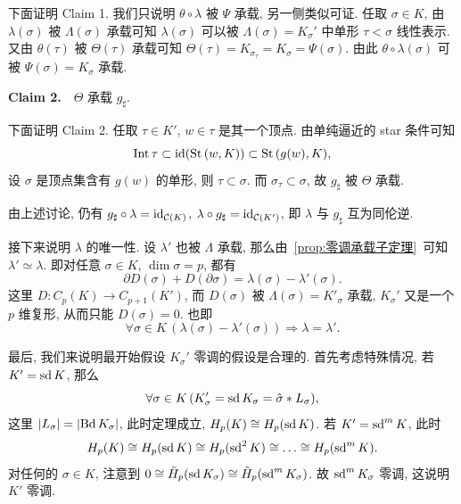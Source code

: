 \begin{Proof}
	下面证明 Claim 1. 我们只说明 $ \theta\circ\lambda $ 被 $ \Psi $ 承载, 另一侧类似可证. 任取 $ \sigma\in K $, 由 $ \lambda(\sigma) $ 被 $ \Lambda(\sigma) $ 承载可知 $ \lambda(\sigma) $ 可以被 $ \Lambda(\sigma)=K_\sigma' $ 中单形 $ \tau<\sigma $ 线性表示. 又由 $ \theta(\tau) $ 被 $ \Theta(\tau) $ 承载可知 $ \Theta(\tau)=K_{\sigma_\tau}=K_\sigma=\Psi(\sigma) $. 由此 $ \theta\circ\lambda(\sigma) $ 可被 $ \Psi(\sigma)=K_\sigma $ 承载.

	\textbf{Claim 2.}\ \ $ \Theta $ 承载 $ g_\sharp $.

	下面证明 Claim 2. 任取 $ \tau\in K' $, $ w\in\tau $ 是其一个顶点. 由单纯逼近的 star 条件可知
	\[
		\mathrm{Int}\,\tau\subset\mathrm{id}(\mathrm{St}\,(w,K))\subset\mathrm{St}\,(g(w),K),
	\]
	设 $ \sigma $ 是顶点集含有 $ g(w) $ 的单形, 则 $ \tau\subset\sigma $. 而 $ \sigma_\tau\subset\sigma $, 故 $ g_\sharp $ 被 $ \Theta $ 承载.

	由上述讨论, 仍有 $ g_\sharp\circ\lambda=\mathrm{id}_{\mathcal{C}(K)} $, $ \lambda\circ g_\sharp=\mathrm{id}_{\mathcal{C}(K')} $, 即 $ \lambda $ 与 $ g_\sharp $ 互为同伦逆.

	接下来说明 $ \lambda $ 的唯一性. 设 $ \lambda' $ 也被 $ \Lambda $ 承载, 那么由~\ref{prop:零调承载子定理}~可知 $ \lambda'\simeq\lambda $. 即对任意 $ \sigma\in K $, $ \dim\sigma=p $, 都有
	\[
		\partial D(\sigma)+D(\partial\sigma)=\lambda(\sigma)-\lambda'(\sigma).
	\]
	这里 $ D : C_p(K)\to C_{p+1}(K') $, 而 $ D(\sigma) $ 被 $ \Lambda(\sigma)=K'_\sigma $ 承载, $ K_\sigma' $ 又是一个 $ p $ 维复形, 从而只能 $ D(\sigma)=0 $. 也即
	\[
		\forall\sigma\in K\,(\lambda(\sigma)-\lambda'(\sigma))\Longrightarrow\lambda=\lambda'.
	\]

	最后, 我们来说明最开始假设 $ K_\sigma' $ 零调的假设是合理的. 首先考虑特殊情况, 若 $ K'=\mathrm{sd}\,K $, 那么
	\[
		\forall\sigma\in K\,(K_\sigma'=\mathrm{sd}\,K_\sigma=\hat{\sigma}*L_\sigma),
	\]
	这里 $ \left| L_\sigma \right| =\left| \mathrm{Bd}\, K_\sigma \right|  $, 此时定理成立, $ H_p(K)\cong H_p(\mathrm{sd}\,K) $. 若 $ K'=\mathrm{sd}^m\,K $, 此时
	\[
		H_p(K)\cong H_p(\mathrm{sd}\,K)\cong H_p(\mathrm{sd}^2\,K)\cong\dots\cong H_p(\mathrm{sd}^m\,K).
	\]
	对任何的 $ \sigma\in K $, 注意到 $ 0\cong\tilde{H}_p(\mathrm{sd}\,K_\sigma)\cong\tilde{H}_p(\mathrm{sd}^m\,K_\sigma) $. 故 $ \mathrm{sd}^m\,K_\sigma $ 零调, 这说明 $ K' $ 零调.


\end{Proof}

